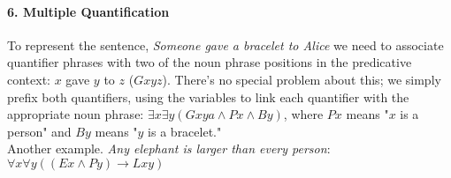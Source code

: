 \documentclass[11pt]{article}
\begin{document}
\paragraph{6. Multiple Quantification}
To represent the sentence, \textit{Someone gave a bracelet to Alice} we need to associate quantifier phrases with two of the noun phrase positions in the predicative context: $x$ gave $y$ to $z$ ($Gxyz$). There's no special problem about this; we simply prefix both quantifiers, using the variables to link each quantifier with the appropriate noun phrase: $\exists x \exists y (Gxya \land Px \land By)$, where $Px$ means "$x$ is a person" and $By$ means "$y$ is a bracelet."\\

Another example. \textit{Any elephant is larger than every person}: $\forall x \forall y ((Ex \land Py) \rightarrow Lxy)$
\end{document}
